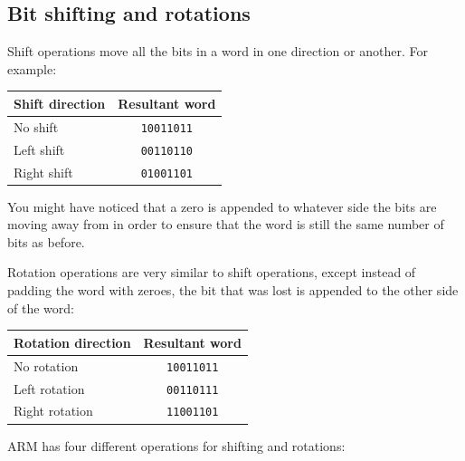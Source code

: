 \subsection{Bit shifting and rotations}

Shift operations move all the bits in a word in one direction or another. For
example:

\begin{center}
	\begin{tabular}{|l|c|}
		\hline
		{\bf Shift direction} & {\bf Resultant word}\\ \hline
		No shift & {\tt 10011011}\\ \hline
		Left shift & {\tt 00110110}\\ \hline
		Right shift & {\tt 01001101}\\ \hline
	\end{tabular}
\end{center}


You might have noticed that a zero is appended to whatever side the bits are
moving away from in order to ensure that the word is still the same number of
bits as before.


Rotation operations are very similar to shift operations, except instead of
padding the word with zeroes, the bit that was lost is appended to the other
side of the word:

\begin{center}
	\begin{tabular}{|l|c|}
		\hline
		{\bf Rotation direction} & {\bf Resultant word}\\ \hline
		No rotation & {\tt 10011011}\\ \hline
		Left rotation & {\tt 00110111}\\ \hline
		Right rotation & {\tt 11001101}\\ \hline
	\end{tabular}
\end{center}

ARM has four different operations for shifting and rotations:

